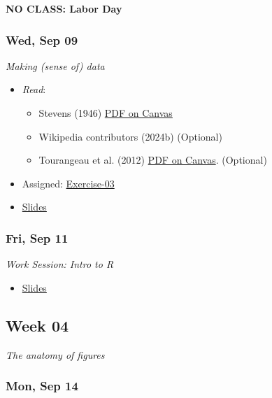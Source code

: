 \documentclass[
  letterpaper,
  DIV=11,
  numbers=noendperiod]{scrartcl}
\providecommand{\tightlist}{%
  \setlength{\itemsep}{0pt}\setlength{\parskip}{0pt}}
\begin{document}
\textbf{NO CLASS: Labor Day}

\subsubsection*{Wed, Sep 09}\label{wed-sep-09}

\emph{Making (sense of) data}

\begin{itemize}
\tightlist
\item
  \emph{Read}:

  \begin{itemize}
  \tightlist
  \item
    Stevens (1946) \textbar{}
    \href{https://psu.instructure.com/courses/2484925/files?preview=193582608}{PDF
    on Canvas}
  \item
    Wikipedia contributors (2024b) (Optional)
  \item
    Tourangeau et al. (2012) \textbar{}
    \href{https://psu.instructure.com/courses/2484925/files?preview=193582611}{PDF
    on Canvas}. (Optional)
  \end{itemize}
\item
  {Assigned}: \href{exercises/ex-03-making-data.qmd}{Exercise-03}
\item
  \href{404.qmd}{Slides}
\end{itemize}

\subsubsection*{Fri, Sep 11}\label{fri-sep-11}

\emph{Work Session: Intro to R}

\begin{itemize}
\tightlist
\item
  \href{404.qmd}{Slides}
\end{itemize}

\subsection*{Week 04}\label{week-04}

\emph{The anatomy of figures}

\subsubsection*{Mon, Sep 14}\label{mon-sep-14}
\end{document}

